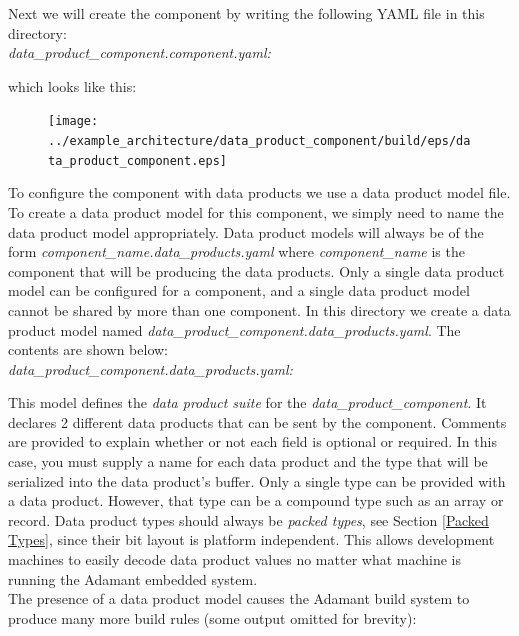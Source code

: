Next we will create the component by writing the following YAML file in this directory: \\

\textit{data\_product\_component.component.yaml:}

which looks like this:

\begin{figure}[H]
  \texttt{[image: ../example\_architecture/data\_product\_component/build/eps/data\_product\_component.eps]}
\end{figure}

To configure the component with data products we use a data product model file. To create a data product model for this component, we simply need to name the data product model appropriately. Data product models will always be of the form \textit{component\_name.data\_products.yaml} where \textit{component\_name} is the component that will be producing the data products. Only a single data product model can be configured for a component, and a single data product model cannot be shared by more than one component. In this directory we create a data product model named \textit{data\_product\_component.data\_products.yaml}. The contents are shown below: \\

\textit{data\_product\_component.data\_products.yaml:}

This model defines the \textit{data product suite} for the \textit{data\_product\_component}. It declares 2 different data products that can be sent by the component. Comments are provided to explain whether or not each field is optional or required. In this case, you must supply a name for each data product and the type that will be serialized into the data product's buffer. Only a single type can be provided with a data product. However, that type can be a compound type such as an array or record. Data product types should always be \textit{packed types}, see Section \ref{Packed Types}, since their bit layout is platform independent. This allows development machines to easily decode data product values no matter what machine is running the Adamant embedded system. \\

The presence of a data product model causes the Adamant build system to produce many more build rules (some output omitted for brevity):

